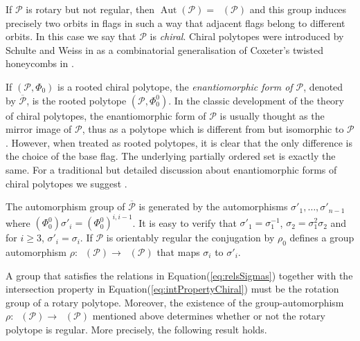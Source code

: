 \documentclass[final]{amsart}
\theoremstyle{plain}
\theoremstyle{definition}
\theoremstyle{remark}
\numberwithin{equation}{section}
\renewcommand{\{}{\lbrace}
\renewcommand{\}}{\rbrace}
\renewcommand{\bar}{\overline}
\newcommand{\cP}{\mathcal{P}}
\DeclareMathOperator{\aut}{Aut} \DeclareMathOperator{\autp}{\aut^{+}}
\newcommand{\baseFlag}{\Phi_{0}}
\begin{document}
If $\cP$ is rotary but not regular, then $\aut(\cP) = \autp(\cP)$ and this group induces precisely two orbits in flags in such a way that adjacent flags belong to different orbits. 
In this case we say that $\cP$ is \emph{chiral}. 
Chiral polytopes were introduced by Schulte and Weiss in \cite{SchulteWeiss_1991_ChiralPolytopes} as a combinatorial generalisation of Coxeter's twisted honeycombs in \cite{Coxeter_1970_TwistedHoneycombs}.


If $(\cP,\baseFlag)$ is a rooted chiral polytope, the \emph{enantiomorphic form of $\cP$}, denoted by $\bar{\cP}$, is the rooted polytope $(\cP, \baseFlag^{0})$.
In the classic development of the theory of chiral polytopes, the enantiomorphic form of $\cP$ is usually thought as the mirror image of $\cP$, thus as a polytope which is different from but isomorphic to $\cP$.
However, when treated as rooted polytopes, it is clear that the only difference is the choice of the base flag.
The underlying partially ordered set is exactly the same. 
For a traditional but detailed discussion about enantiomorphic forms of chiral polytopes we suggest \cite[Section 3]{SchulteWeiss_1994_ChiralityProjectiveLinear}.


The automorphism group of $\bar{\cP}$ is generated by the automorphisms $\sigma'_{1}, \dots, \sigma'_{n-1}$ where $(\baseFlag^{0}) \sigma'_{i} = (\baseFlag^{0})^{i,i-1}$.
It is easy to verify that $\sigma'_{1} = \sigma_{1}^{-1} $, $\sigma_{2} = \sigma_{1}^{2} \sigma_{2}$ and for $i \geq 3$, $\sigma'_{i} = \sigma_{i}$. 
If $\cP$ is orientably regular the conjugation by $\rho_{0}$ defines a group automorphism $\rho: \autp(\cP) \to \autp(\cP)$ that maps $\sigma_{i}$ to $\sigma'_{i}$. 

A group that satisfies the relations in Equation\nobreakspace \textup {(\ref {eq:relsSigmas})} together with the intersection property in Equation\nobreakspace \textup {(\ref {eq:intPropertyChiral})} must be the rotation group of a rotary polytope.
Moreover, the existence of the group-automorphism $\rho: \autp(\cP) \to \autp(\cP)$ mentioned above determines whether or not the rotary polytope is regular.
More precisely, the following result holds.
 
\end{document}
